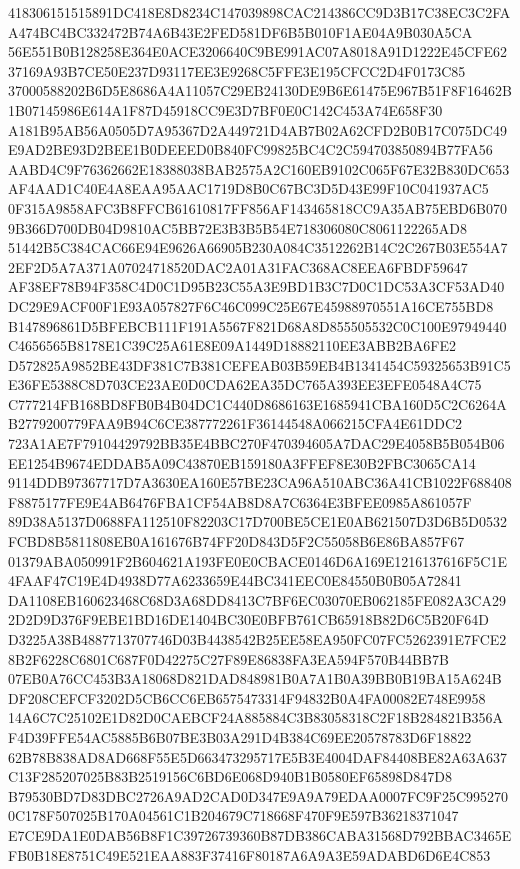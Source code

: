 \documentclass[UTF8,fontset=fandol,zihao=-4,a4paper]{ctexart}
\begin{document}
{{418306151515891DC418E8D8234C147039898CAC214386CC9D3B17C38EC3C2FAA474BC4BC332472B74A6B43E2FED581DF6B5B010F1AE04A9B030A5CA
56E551B0B128258E364E0ACE3206640C9BE991AC07A8018A91D1222E45CFE6237169A93B7CE50E237D93117EE3E9268C5FFE3E195CFCC2D4F0173C85
37000588202B6D5E8686A4A11057C29EB24130DE9B6E61475E967B51F8F16462B1B07145986E614A1F87D45918CC9E3D7BF0E0C142C453A74E658F30
A181B95AB56A0505D7A95367D2A449721D4AB7B02A62CFD2B0B17C075DC49E9AD2BE93D2BEE1B0DEEED0B840FC99825BC4C2C594703850894B77FA56
AABD4C9F76362662E18388038BAB2575A2C160EB9102C065F67E32B830DC653AF4AAD1C40E4A8EAA95AAC1719D8B0C67BC3D5D43E99F10C041937AC5
0F315A9858AFC3B8FFCB61610817FF856AF143465818CC9A35AB75EBD6B0709B366D700DB04D9810AC5BB72E3B3B5B54E718306080C8061122265AD8
51442B5C384CAC66E94E9626A66905B230A084C3512262B14C2C267B03E554A72EF2D5A7A371A07024718520DAC2A01A31FAC368AC8EEA6FBDF59647
AF38EF78B94F358C4D0C1D95B23C55A3E9BD1B3C7D0C1DC53A3CF53AD40DC29E9ACF00F1E93A057827F6C46C099C25E67E45988970551A16CE755BD8
B147896861D5BFEBCB111F191A5567F821D68A8D855505532C0C100E97949440C4656565B8178E1C39C25A61E8E09A1449D18882110EE3ABB2BA6FE2
D572825A9852BE43DF381C7B381CEFEAB03B59EB4B1341454C59325653B91C5E36FE5388C8D703CE23AE0D0CDA62EA35DC765A393EE3EFE0548A4C75
C777214FB168BD8FB0B4B04DC1C440D8686163E1685941CBA160D5C2C6264AB2779200779FAA9B94C6CE387772261F36144548A066215CFA4E61DDC2
723A1AE7F79104429792BB35E4BBC270F470394605A7DAC29E4058B5B054B06EE1254B9674EDDAB5A09C43870EB159180A3FFEF8E30B2FBC3065CA14
9114DDB97367717D7A3630EA160E57BE23CA96A510ABC36A41CB1022F688408F8875177FE9E4AB6476FBA1CF54AB8D8A7C6364E3BFEE0985A861057F
89D38A5137D0688FA112510F82203C17D700BE5CE1E0AB621507D3D6B5D0532FCBD8B5811808EB0A161676B74FF20D843D5F2C55058B6E86BA857F67
01379ABA050991F2B604621A193FE0E0CBACE0146D6A169E1216137616F5C1E4FAAF47C19E4D4938D77A6233659E44BC341EEC0E84550B0B05A72841
DA1108EB160623468C68D3A68DD8413C7BF6EC03070EB062185FE082A3CA292D2D9D376F9EBE1BD16DE1404BC30E0BFB761CB65918B82D6C5B20F64D
D3225A38B4887713707746D03B4438542B25EE58EA950FC07FC5262391E7FCE28B2F6228C6801C687F0D42275C27F89E86838FA3EA594F570B44BB7B
07EB0A76CC453B3A18068D821DAD848981B0A7A1B0A39BB0B19BA15A624BDF208CEFCF3202D5CB6CC6EB6575473314F94832B0A4FA00082E748E9958
14A6C7C25102E1D82D0CAEBCF24A885884C3B83058318C2F18B284821B356AF4D39FFE54AC5885B6B07BE3B03A291D4B384C69EE20578783D6F18822
62B78B838AD8AD668F55E5D663473295717E5B3E4004DAF84408BE82A63A637C13F285207025B83B2519156C6BD6E068D940B1B0580EF65898D847D8
B79530BD7D83DBC2726A9AD2CAD0D347E9A9A79EDAA0007FC9F25C9952700C178F507025B170A04561C1B204679C718668F470F9E597B36218371047
E7CE9DA1E0DAB56B8F1C39726739360B87DB386CABA31568D792BBAC3465EFB0B18E8751C49E521EAA883F37416F80187A6A9A3E59ADABD6D6E4C853
}}
\end{document}
